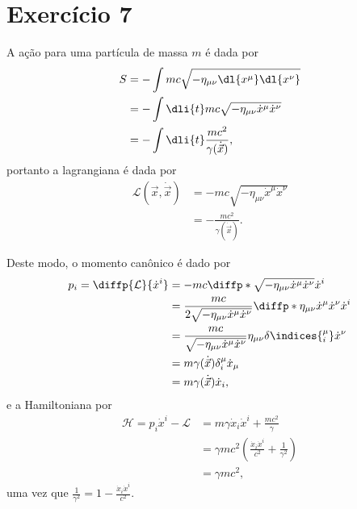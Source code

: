 \section*{Exercício 7}

A ação para uma partícula de massa \(m\) é dada por
\begin{align*}
    S &= -\int mc\sqrt{-\eta_{\mu\nu} \dl{x^\mu} \dl{x^\nu}}\\
      &= - \int \dli{t}mc \sqrt{-\eta_{\mu\nu} \dot{x}^\mu \dot{x}^\nu}\\
      &= - \int \dli{t} \frac{mc^2}{\gamma(\dot{\vec{x}})},
\end{align*}
portanto a lagrangiana é dada por
\begin{align*}
    \mathcal{L}(\vec{x}, \dot{\vec{x}}) &= - mc\sqrt{-\eta_{\mu\nu}\dot{x}^\mu\dot{x}^\nu}\\
                                        &= - \frac{mc^2}{\gamma(\dot{\vec{x}})}.
\end{align*}

Deste modo, o momento canônico é dado por
\begin{align*}
    p_i = \diffp{\mathcal{L}}{\dot{x}^i} &= -mc\diffp*{\sqrt{-\eta_{\mu\nu}\dot{x}^\mu\dot{x}^\nu}}{\dot{x}^i}\\
                                         &= \frac{mc}{2\sqrt{-\eta_{\mu\nu}\dot{x}^\mu \dot{x}^\nu}}\diffp*{\eta_{\mu\nu}\dot{x}^\mu\dot{x}^\nu}{\dot{x}^i}\\
                                         &= \frac{mc}{\sqrt{-\eta_{\mu\nu}\dot{x}^\mu\dot{x}^\nu}} \eta_{\mu\nu} \delta\indices{^\mu_i} \dot{x}^\nu\\
                                         &= m\gamma(\dot{\vec{x}}) \delta^\mu_i \dot{x}_\mu\\
                                         &= m \gamma(\dot{\vec{x}}) \dot{x}_i,
\end{align*}
e a Hamiltoniana por
\begin{align*}
    \mathcal{H} = p_i\dot{x}^i - \mathcal{L} &= m \gamma \dot{x}_i\dot{x}^i + \frac{mc^2}{\gamma}\\
                                             &=  \gamma mc^2\left(\frac{\dot{x}_i\dot{x}^i}{c^2} + \frac{1}{\gamma^2}\right)\\
                                             &= \gamma mc^2,
\end{align*}
uma vez que \(\frac{1}{\gamma^2} = 1 - \frac{\dot{x}_i\dot{x}^i}{c^2}.\)

